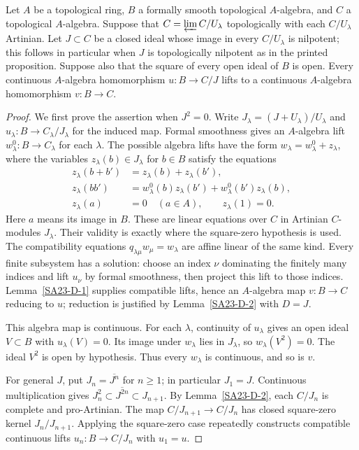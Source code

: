 \begin{theorem}\label{SA23-D-3}
Let $A$ be a topological ring, $B$ a formally smooth topological
$A$-algebra, and $C$ a topological $A$-algebra.  Suppose that
$C=\varprojlim C/U_\lambda$ topologically with each $C/U_\lambda$
Artinian.  Let $J\subset C$ be a closed ideal whose image in every
$C/U_\lambda$ is nilpotent; this follows in particular when $J$ is
topologically nilpotent as in the printed proposition.  Suppose also
that the square of every open ideal of $B$ is open.  Every continuous
$A$-algebra homomorphism $u:B\to C/J$ lifts to a continuous
$A$-algebra homomorphism $v:B\to C$.
\end{theorem}
\begin{proof}
We first prove the assertion when $J^2=0$.  Write
$J_\lambda=(J+U_\lambda)/U_\lambda$ and
$u_\lambda:B\to C_\lambda/J_\lambda$ for the induced map.
Formal smoothness gives an $A$-algebra lift
$w^0_\lambda:B\to C_\lambda$ for each $\lambda$.
The possible algebra lifts have the form
$w_\lambda=w^0_\lambda+z_\lambda$, where the variables
$z_\lambda(b)\in J_\lambda$ for $b\in B$ satisfy the equations
\[
\begin{split}
 z_\lambda(b+b')&=z_\lambda(b)+z_\lambda(b'),\\
 z_\lambda(bb')&=w^0_\lambda(b)z_\lambda(b')
                  +w^0_\lambda(b')z_\lambda(b),\\
 z_\lambda(a)&=0\quad(a\in A),\qquad z_\lambda(1)=0.
\end{split}
\]
Here $a$ means its image in $B$.  These are linear equations over
$C$ in Artinian $C$-modules $J_\lambda$.  Their validity is exactly
where the square-zero hypothesis is used.  The compatibility
equations $q_{\lambda\mu}w_\mu=w_\lambda$ are affine linear of
the same kind.  Every finite subsystem has a solution: choose an
index $\nu$ dominating the finitely many indices and lift
$u_\nu$ by formal smoothness, then project this lift to those
indices.  Lemma~\ref{SA23-D-1} supplies compatible lifts, hence an
$A$-algebra map $v:B\to C$ reducing to $u$; reduction is justified
by Lemma~\ref{SA23-D-2} with $D=J$.

This algebra map is continuous.  For each $\lambda$, continuity of
$u_\lambda$ gives an open ideal $V\subset B$ with
$u_\lambda(V)=0$.  Its image under $w_\lambda$ lies in
$J_\lambda$, so $w_\lambda(V^2)=0$.  The ideal $V^2$ is open by
hypothesis.  Thus every $w_\lambda$ is continuous, and so is $v$.

For general $J$, put $J_n=\overline{J^n}$ for $n\geq1$; in
particular $J_1=J$.  Continuous multiplication gives
$J_n^2\subset\overline{J^{2n}}\subset J_{n+1}$.  By
Lemma~\ref{SA23-D-2}, each $C/J_n$ is complete and pro-Artinian.
The map $C/J_{n+1}\to C/J_n$ has closed square-zero kernel
$J_n/J_{n+1}$.  Applying the square-zero case repeatedly constructs
compatible continuous lifts $u_n:B\to C/J_n$ with $u_1=u$.


\end{proof}
